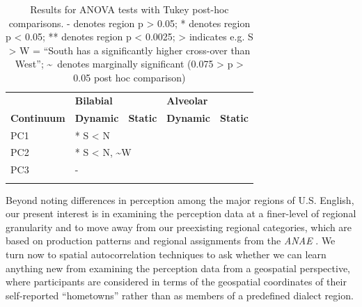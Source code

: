 \documentclass[output=paper]{LSP/langsci}
\begin{document}
\begin{table}
\begin{tabular}{lllll} & {\bfseries Bilabial} &  & {\bfseries Alveolar} & \\
\lsptoprule
{\bfseries Continuum} & {\bfseries Dynamic} & {\bfseries Static} & {\bfseries Dynamic} & {\bfseries Static}\\
{\mdseries PC1} & \multicolumn{4}{l}{ * S {\textless} N\par}\\
{\mdseries PC2} & \multicolumn{4}{l}{ * S {\textless} N, \~{}W\par}\\
{\mdseries PC3} & \multicolumn{4}{l}{ {}-\par}\\
\lspbottomrule
\end{tabular}
\label{tab:1}
\caption{Results for ANOVA tests with Tukey post-hoc comparisons. - denotes region p {\textgreater} 0.05; * denotes region p {\textless} 0.05; ** denotes region p {\textless} 0.0025; {\textgreater} indicates e.g. S {\textgreater} W = “South has a significantly higher cross-over than West”; \textasciitilde ~denotes marginally significant (0.075 {\textgreater} p {\textgreater} 0.05 post hoc comparison)}
\end{table}

Beyond noting differences in perception among the major regions of U.S. English, our present interest is in examining the perception data at a finer-level of regional granularity and to move away from our preexisting regional categories, which are based on production patterns and regional assignments from the \textit{ANAE }\citep{labov_atlas_2006-1}. We turn now to spatial autocorrelation techniques to ask whether we can learn anything new from examining the perception data from a geospatial perspective, where participants are considered in terms of the geospatial coordinates of their self-reported “hometowns” rather than as members of a predefined dialect region. 
\end{document}
